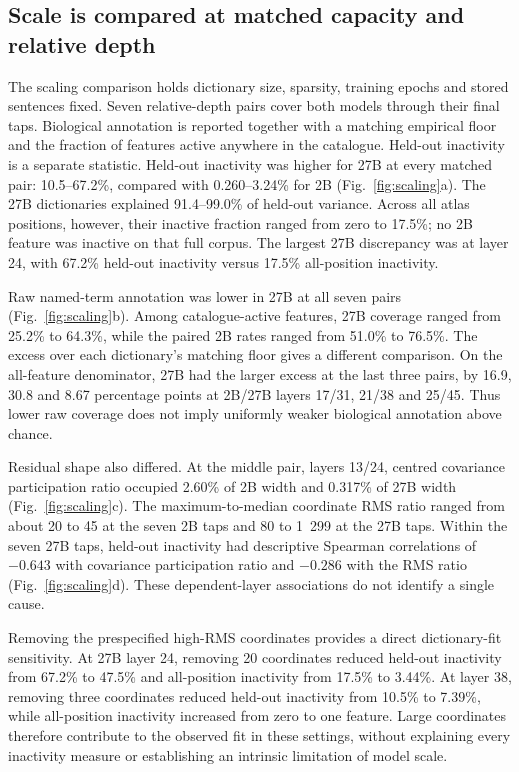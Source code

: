 \documentclass[review,authoryear,12pt]{elsarticle}
\begin{document}
\subsection{Scale is compared at matched capacity and relative depth}

The scaling comparison holds dictionary size, sparsity, training epochs and stored sentences
fixed. Seven relative-depth pairs cover both models through their final taps. Biological
annotation is reported together with a matching empirical floor and the fraction of features
active anywhere in the catalogue. Held-out inactivity is a separate statistic.
Held-out inactivity was higher for 27B at every matched pair: 10.5--67.2\%, compared with
0.260--3.24\% for 2B (Fig.~\ref{fig:scaling}a). The 27B dictionaries explained 91.4--99.0\%
of held-out variance. Across all atlas positions, however, their inactive fraction ranged from
zero to 17.5\%; no 2B feature was inactive on that full corpus. The largest 27B discrepancy was
at layer 24, with 67.2\% held-out inactivity versus 17.5\% all-position inactivity.

Raw named-term annotation was lower in 27B at all seven pairs (Fig.~\ref{fig:scaling}b).
Among catalogue-active features, 27B coverage ranged from 25.2\% to 64.3\%, while the paired
2B rates ranged from 51.0\% to 76.5\%. The excess over each dictionary's matching floor gives
a different comparison. On the all-feature denominator, 27B had the larger excess at the last
three pairs, by 16.9, 30.8 and 8.67 percentage points at 2B/27B layers 17/31, 21/38 and 25/45.
Thus lower raw coverage does not imply uniformly weaker biological annotation above chance.

Residual shape also differed. At the middle pair, layers 13/24, centred covariance participation
ratio occupied 2.60\% of 2B width and 0.317\% of 27B width (Fig.~\ref{fig:scaling}c).
The maximum-to-median coordinate RMS ratio ranged from about 20 to 45 at the seven 2B taps and
80 to 1~299 at the 27B taps. Within the seven 27B taps, held-out inactivity had descriptive
Spearman correlations of $-0.643$ with covariance participation ratio and $-0.286$ with the RMS
ratio (Fig.~\ref{fig:scaling}d). These dependent-layer associations do not identify a single cause.

Removing the prespecified high-RMS coordinates provides a direct dictionary-fit sensitivity.
At 27B layer 24, removing 20 coordinates reduced held-out inactivity from 67.2\% to 47.5\%
and all-position inactivity from 17.5\% to 3.44\%. At layer 38, removing three coordinates
reduced held-out inactivity from 10.5\% to 7.39\%, while all-position inactivity increased from
zero to one feature. Large coordinates therefore contribute to the observed fit in these settings,
without explaining every inactivity measure or establishing an intrinsic limitation of model scale.
\end{document}
